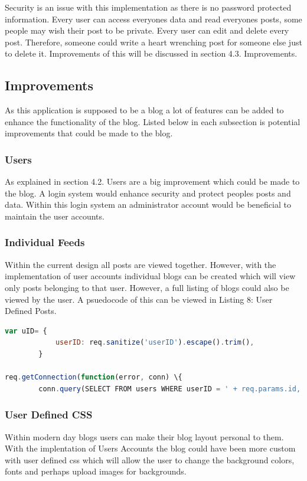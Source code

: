 \documentclass[10pt, a4paper]{article}
\begin{document}
Security is an issue with this implementation as there is no password protected information.  Every user can access everyones data and read everyones posts, some people may wish their post to be private.  Every user can edit and delete every post. Therefore, someone could write a heart wrenching post for someone else just to delete it.  Improvements of this will be discussed in section 4.3. Improvements. 
	
\subsection{Improvements}
As this application is supposed to be a blog a lot of features can be added to enhance the functionality of the blog. Listed below in each subsection is potential improvements that could be made to the blog. 
\subsubsection{Users}
As explained in section 4.2. Users are a big improvement which could be made to the blog.  A login system would enhance security and protect peoples posts and data. Within this login system an administrator account would be beneficial to maintain the user accounts.
\subsubsection{Individual Feeds}
Within the current design all posts are viewed together.  However, with the implementation of user accounts individual blogs can be created which will view only posts belonging to that user. However, a full listing of blogs could also be viewed by the user.  A psuedocode of this can be viewed in Listing 8: User Defined Posts.
\begin{lstlisting}[language=javascript,caption={User Defined Posts}]
var uID= {
            userID: req.sanitize('userID').escape().trim(),
        }

req.getConnection(function(error, conn) \{
        conn.query(SELECT FROM users WHERE userID = ' + req.params.id, uID,
\end{lstlisting}

\subsubsection{User Defined CSS}
Within modern day blogs users can make their blog layout personal to them.  With the implentation of Users Accounts the blog could have been more custom with user defined css which will allow the user to change the background colors, fonts and perhaps upload images for backgrounds.  
\end{document}
